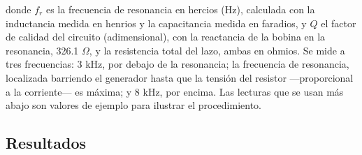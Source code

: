 \documentclass[11pt,letterpaper]{article}
\begin{document}
donde $f_r$ es la frecuencia de resonancia en hercios (Hz), calculada con la inductancia medida en henrios y la capacitancia medida en faradios, y $Q$ el factor de calidad del circuito (adimensional), con la reactancia de la bobina en la resonancia, 326.1 \ensuremath{\Omega}, y la resistencia total del lazo, ambas en ohmios. Se mide a tres frecuencias: 3 kHz, por debajo de la resonancia; la frecuencia de resonancia, localizada barriendo el generador hasta que la tensión del resistor ---proporcional a la corriente--- es máxima; y 8 kHz, por encima. Las lecturas que se usan más abajo son valores de ejemplo para ilustrar el procedimiento.

\subsection{Resultados}
\end{document}
